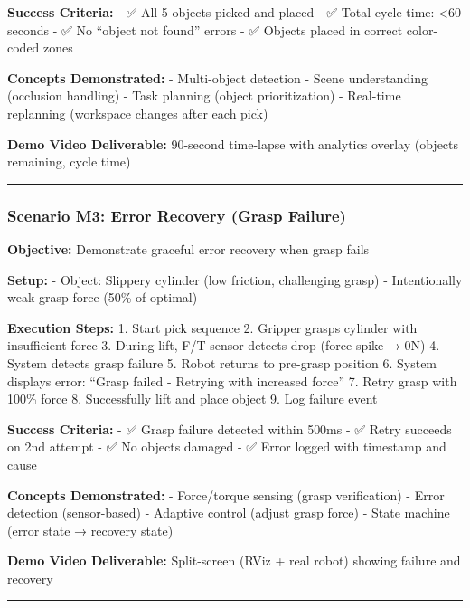 \documentclass[
]{article}
\begin{document}
\textbf{Success Criteria:} - ✅ All 5 objects picked and placed - ✅
Total cycle time: \textless60 seconds - ✅ No ``object not found''
errors - ✅ Objects placed in correct color-coded zones

\textbf{Concepts Demonstrated:} - Multi-object detection - Scene
understanding (occlusion handling) - Task planning (object
prioritization) - Real-time replanning (workspace changes after each
pick)

\textbf{Demo Video Deliverable:} 90-second time-lapse with analytics
overlay (objects remaining, cycle time)

\begin{center}\rule{0.5\linewidth}{0.5pt}\end{center}

\hypertarget{scenario-m3-error-recovery-grasp-failure}{%
\subsubsection{Scenario M3: Error Recovery (Grasp
Failure)}\label{scenario-m3-error-recovery-grasp-failure}}

\textbf{Objective:} Demonstrate graceful error recovery when grasp fails

\textbf{Setup:} - Object: Slippery cylinder (low friction, challenging
grasp) - Intentionally weak grasp force (50\% of optimal)

\textbf{Execution Steps:} 1. Start pick sequence 2. Gripper grasps
cylinder with insufficient force 3. During lift, F/T sensor detects drop
(force spike → 0N) 4. System detects grasp failure 5. Robot returns to
pre-grasp position 6. System displays error: ``Grasp failed - Retrying
with increased force'' 7. Retry grasp with 100\% force 8. Successfully
lift and place object 9. Log failure event

\textbf{Success Criteria:} - ✅ Grasp failure detected within 500ms - ✅
Retry succeeds on 2nd attempt - ✅ No objects damaged - ✅ Error logged
with timestamp and cause

\textbf{Concepts Demonstrated:} - Force/torque sensing (grasp
verification) - Error detection (sensor-based) - Adaptive control
(adjust grasp force) - State machine (error state → recovery state)

\textbf{Demo Video Deliverable:} Split-screen (RViz + real robot)
showing failure and recovery

\begin{center}\rule{0.5\linewidth}{0.5pt}\end{center}
\end{document}

